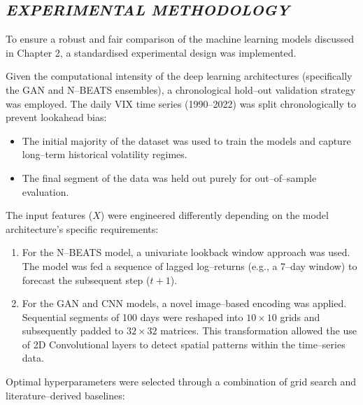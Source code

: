 \documentclass[12pt,a4paper]{report}
\numberwithin{equation}{section}
\begin{document}
\hypertarget{experimental--methodology}{%
\subsection{\texorpdfstring{\emph{EXPERIMENTAL METHODOLOGY}
}{EXPERIMENTAL METHODOLOGY }}\label{experimental--methodology}}

To ensure a robust and fair comparison of the machine learning models discussed in Chapter 2, a standardised experimental design was implemented.

Given the computational intensity of the deep learning architectures (specifically the GAN and N--BEATS ensembles), a chronological hold--out validation strategy was employed. The daily VIX time series (1990--2022) was split chronologically to prevent lookahead bias:
\begin{itemize}
    \item {} The initial majority of the dataset was used to train the models and capture long--term historical volatility regimes.
    \item {} The final segment of the data was held out purely for out--of--sample evaluation.
\end{itemize}

The input features ($X$) were engineered differently depending on the model architecture's specific requirements:

\begin{enumerate}
    \def\labelenumi{\roman{enumi}.}
    \item {} For the N--BEATS model, a univariate lookback window approach was used. The model was fed a sequence of lagged log--returns (e.g., a 7--day window) to forecast the subsequent step ($t+1$).
    \item {} For the GAN and CNN models, a novel image--based encoding was applied. Sequential segments of 100 days were reshaped into $10 \times 10$ grids and subsequently padded to $32 \times 32$ matrices. This transformation allowed the use of 2D Convolutional layers to detect spatial patterns within the time--series data.
\end{enumerate}

Optimal hyperparameters were selected through a combination of grid search and literature--derived baselines:
\end{document}
